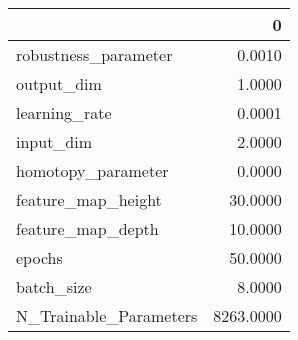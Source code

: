 \begin{tabular}{lr}
\toprule
{} &          0 \\
\midrule
robustness\_parameter   &     0.0010 \\
output\_dim             &     1.0000 \\
learning\_rate          &     0.0001 \\
input\_dim              &     2.0000 \\
homotopy\_parameter     &     0.0000 \\
feature\_map\_height     &    30.0000 \\
feature\_map\_depth      &    10.0000 \\
epochs                 &    50.0000 \\
batch\_size             &     8.0000 \\
N\_Trainable\_Parameters &  8263.0000 \\
\bottomrule
\end{tabular}
